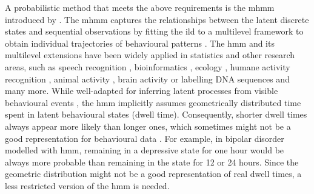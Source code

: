 A probabilistic method that meets the above requirements is the \ac{mhmm} introduced by \cite{altman_mixed_2007}. The \ac{mhmm} captures the relationships between the latent discrete states and sequential observations by fitting the \ac{ild} to a multilevel framework to obtain individual trajectories of behavioural patterns \citep[e.g.,][]{Baum_Eagon_1967, Rabiner_1989, Zucchini_MacDonald_2009}. The \ac{hmm} and its multilevel extensions have been widely applied in statistics and other research areas, such as speech recognition \citep{Markov_1913,Juang_Rabiner_1991}, bioinformatics \citep{Durbin_1998,Eddy_1998}, ecology \citep{Joo_Bertrand_Tam_Fablet_2013,McClintock_2021}, humane activity recognition \citep{Czúni_2010,Ronao_Cho_2017,martindale_smart_2017,cohen_emo}, animal activity \citep{Bode_Seitz_2018,McKellar_Langrock_Walters_Kesler_2015}, brain activity \citep{kirchherr_bayesian_2022,El_Moursy_ElAzhary_Younis_2014} or labelling DNA sequences \citep{Karplus_Barrett_Hughey_1998} and many more. While well-adapted for inferring latent processes from visible behavioural events \citep{Boussemart}, the \ac{hmm} implicitly assumes geometrically distributed time spent in latent behavioural states (dwell time). Consequently, shorter dwell times always appear more likely than longer ones, which sometimes might not be a good representation for behavioural data \citep{Tokdar_Xi_Kelly_Kass_2010,Emm_Th}. For example, in bipolar disorder modelled with \ac{hmm}, remaining in a depressive state for one hour would be always more probable than remaining in the state for 12 or 24 hours. Since the geometric distribution might not be a good representation of real dwell times, a less restricted version of the \ac{hmm} is needed. 

